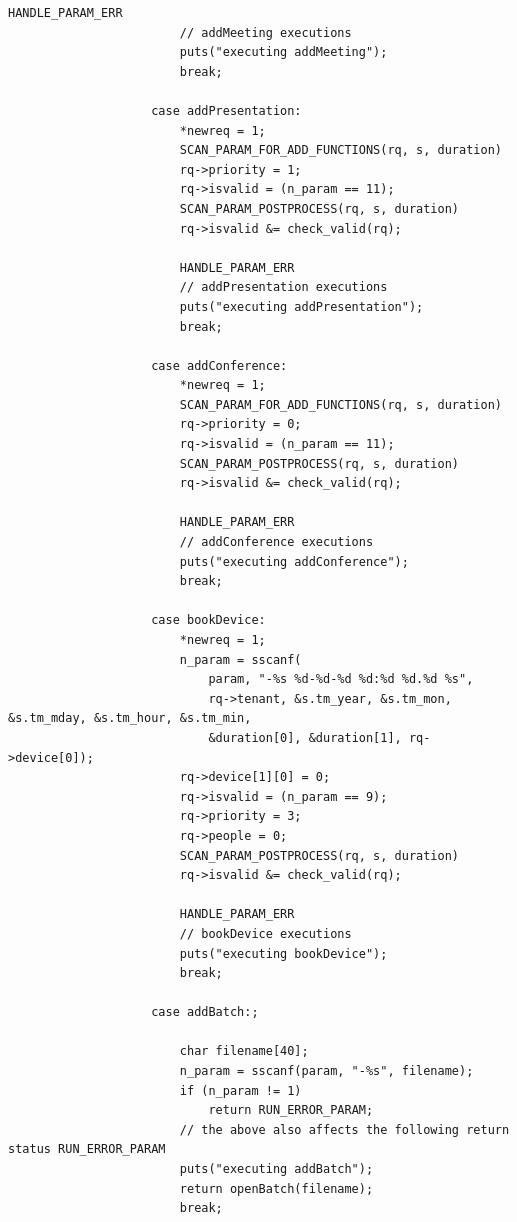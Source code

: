 \documentclass{article}
\begin{document}
\begin{Verbatim}[gobble=8]
                        HANDLE_PARAM_ERR
                        // addMeeting executions
                        puts("executing addMeeting");
                        break;
                
                    case addPresentation:
                        *newreq = 1;
                        SCAN_PARAM_FOR_ADD_FUNCTIONS(rq, s, duration)
                        rq->priority = 1;
                        rq->isvalid = (n_param == 11);
                        SCAN_PARAM_POSTPROCESS(rq, s, duration)
                        rq->isvalid &= check_valid(rq);
                
                        HANDLE_PARAM_ERR
                        // addPresentation executions
                        puts("executing addPresentation");
                        break;
                
                    case addConference:
                        *newreq = 1;
                        SCAN_PARAM_FOR_ADD_FUNCTIONS(rq, s, duration)
                        rq->priority = 0;
                        rq->isvalid = (n_param == 11);
                        SCAN_PARAM_POSTPROCESS(rq, s, duration)
                        rq->isvalid &= check_valid(rq);
                
                        HANDLE_PARAM_ERR
                        // addConference executions
                        puts("executing addConference");
                        break;
                
                    case bookDevice:
                        *newreq = 1;
                        n_param = sscanf(
                            param, "-%s %d-%d-%d %d:%d %d.%d %s",
                            rq->tenant, &s.tm_year, &s.tm_mon, &s.tm_mday, &s.tm_hour, &s.tm_min,
                            &duration[0], &duration[1], rq->device[0]);
                        rq->device[1][0] = 0;
                        rq->isvalid = (n_param == 9);
                        rq->priority = 3;
                        rq->people = 0;
                        SCAN_PARAM_POSTPROCESS(rq, s, duration)
                        rq->isvalid &= check_valid(rq);
                
                        HANDLE_PARAM_ERR
                        // bookDevice executions
                        puts("executing bookDevice");
                        break;
                
                    case addBatch:;
                
                        char filename[40];
                        n_param = sscanf(param, "-%s", filename);
                        if (n_param != 1)
                            return RUN_ERROR_PARAM;
                        // the above also affects the following return status RUN_ERROR_PARAM
                        puts("executing addBatch");
                        return openBatch(filename);
                        break;
                

\end{Verbatim}
\end{document}
